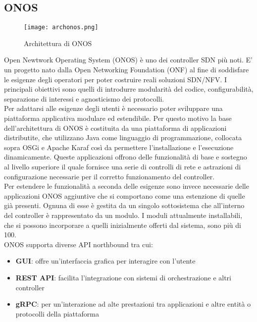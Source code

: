 \subsection{ONOS}
\begin{figure}[h]
    \centering
   \texttt{[image: archonos.png]}
    \caption{Architettura di ONOS}
    \label{fig:img3}
\end{figure}
Open Newtwork Operating System (ONOS) \cite{ONOS} è uno dei controller SDN più noti. 
E' un progetto nato dalla Open Networking Foundation (ONF) \cite{ONF} al fine di soddisfare le esigenze degli operatori per poter costruire reali soluzioni SDN/NFV.
I principali obiettivi sono quelli di introdurre modularità del codice, configurabilità, separazione di interessi e agnosticismo dei protocolli.
\\Per adattarsi alle esigenze degli utenti è necessario poter sviluppare una piattaforma applicativa modulare ed estendibile.
Per questo motivo la base dell'architettura di ONOS è costituita da una piattaforma di applicazioni distributite, che utilizzano Java come linguaggio di programmazione,
collocata sopra OSGi \cite{osgi} e Apache Karaf \cite{Apache} così da permettere l'installazione e l'esecuzione dinamicamente. 
Queste applicazioni offrono delle funzionalità di base e sostegno al livello superiore il quale fornisce una serie di controlli di rete e astrazioni di configurazione necessarie per il corretto funzionamento del controller.
\\Per estendere le funzionalità a seconda delle esigenze sono invece necessarie delle applicazioni ONOS aggiuntive che si comportano come una estenzione di quelle già presenti. 
Ognuna di esse è gestita da un singolo sottosistema che all'interno del controller è rappresentato da un modulo.
I moduli attualmente installabili, che si possono incorporare a quelli inizialmente offerti dal sistema, sono più di 100.
\\ONOS supporta diverse API northbound tra cui:
\begin{itemize}
\item \textbf{GUI}: offre un'interfaccia grafica per interagire con l'utente
\item \textbf{REST API}: facilita l'integrazione con sistemi di orchestrazione e altri controller 
\item \textbf{gRPC}: per un'interazione ad alte prestazioni tra applicazioni e altre entità o protocolli della piattaforma
\end{itemize}
